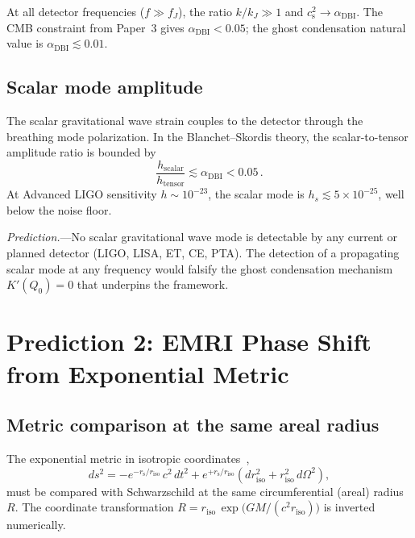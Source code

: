 \documentclass[prl,twocolumn,superscriptaddress,longbibliography]{revtex4-2}
\newcommand{\rs}{r_{\mathrm{s}}}
\newcommand{\cs}{c_{\mathrm{s}}}
\begin{document}
At all detector frequencies ($f \gg f_J$), the ratio $k/k_J
\gg 1$ and $\cs^2 \to \alpha_{\mathrm{DBI}}$.  The CMB
constraint from Paper~3 gives $\alpha_{\mathrm{DBI}} < 0.05$;
the ghost condensation natural value is $\alpha_{\mathrm{DBI}}
\lesssim 0.01$.

\subsection{Scalar mode amplitude}

The scalar gravitational wave strain couples to the detector
through the breathing mode polarization.  In the
Blanchet--Skordis theory, the scalar-to-tensor amplitude ratio
is bounded by~\cite{BS2024,SchumacherEA2024}
\begin{equation}
  \frac{h_{\mathrm{scalar}}}{h_{\mathrm{tensor}}}
  \lesssim \alpha_{\mathrm{DBI}} < 0.05\,.
\end{equation}
At Advanced LIGO sensitivity $h \sim 10^{-23}$, the scalar mode
is $h_s \lesssim 5 \times 10^{-25}$, well below the noise floor.

\emph{Prediction.}---No scalar gravitational wave mode is
detectable by any current or planned detector (LIGO, LISA, ET,
CE, PTA).  The detection of a propagating scalar mode at any
frequency would falsify the ghost condensation mechanism
$K'(Q_0) = 0$ that underpins the framework.

\section{Prediction 2: EMRI Phase Shift from Exponential Metric}
\label{sec:emri}

\subsection{Metric comparison at the same areal radius}

The exponential metric in isotropic coordinates~\cite{Paper2},
\begin{equation}
  ds^2 = -e^{-\rs/r_{\mathrm{iso}}}\,c^2\,dt^2
       + e^{+\rs/r_{\mathrm{iso}}}
       \!\left(dr_{\mathrm{iso}}^2
       + r_{\mathrm{iso}}^2\,d\Omega^2\right),
  \label{eq:exp_metric}
\end{equation}
must be compared with Schwarzschild at the same
circumferential (areal) radius $R$.  The coordinate
transformation $R = r_{\mathrm{iso}}\,
\exp\!\big(GM/(c^2 r_{\mathrm{iso}})\big)$ is inverted
numerically.
\end{document}
